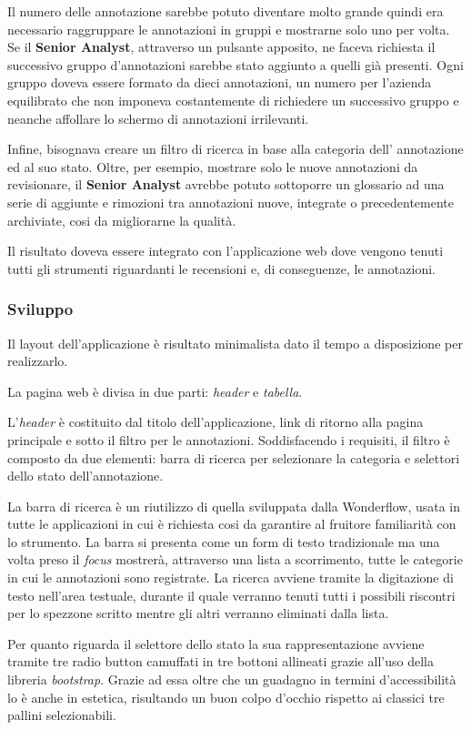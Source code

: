 Il numero delle annotazione sarebbe potuto diventare molto grande quindi era
necessario raggruppare le annotazioni in gruppi e mostrarne solo uno per volta.
Se il \textbf{Senior Analyst}, attraverso un pulsante apposito, ne faceva
richiesta il successivo gruppo d'annotazioni sarebbe stato aggiunto a quelli già
presenti. Ogni gruppo doveva essere formato da dieci annotazioni, un numero per
l'azienda equilibrato che non imponeva costantemente di richiedere un successivo
gruppo e neanche affollare lo schermo di annotazioni irrilevanti.

Infine, bisognava creare un filtro di ricerca in base alla categoria dell'
annotazione ed al suo stato. Oltre, per esempio, mostrare solo le nuove
annotazioni da revisionare, il \textbf{Senior Analyst} avrebbe potuto sottoporre
un glossario ad una serie di aggiunte e rimozioni tra annotazioni nuove,
integrate o precedentemente archiviate, cosi da migliorarne la qualità.

Il risultato doveva essere integrato con l'applicazione web dove vengono tenuti
tutti gli strumenti riguardanti le recensioni e, di conseguenze, le annotazioni.

\subsubsection{Sviluppo}
Il layout dell'applicazione è risultato minimalista dato il tempo a disposizione
per realizzarlo.

La pagina web è divisa in due parti: \textit{header} e \textit{tabella}.

L'\textit{header} è costituito dal titolo dell'applicazione, link di ritorno
alla pagina principale e sotto il filtro per le annotazioni. Soddisfacendo i
requisiti, il filtro è composto da due elementi: barra di ricerca per
selezionare la categoria e selettori dello stato dell'annotazione.

La barra di ricerca è un riutilizzo di quella sviluppata dalla Wonderflow, usata
in tutte le applicazioni in cui è richiesta cosi da garantire al fruitore
familiarità con lo strumento. La barra si presenta come un form di testo
tradizionale ma una volta preso il \textit{focus} mostrerà, attraverso una lista
a scorrimento, tutte le categorie in cui le annotazioni sono registrate. La
ricerca avviene tramite la digitazione di testo nell'area testuale, durante
il quale verranno tenuti tutti i possibili riscontri per lo spezzone scritto
mentre gli altri verranno eliminati dalla lista.

Per quanto riguarda il selettore dello stato la sua rappresentazione avviene
tramite tre radio button camuffati in tre bottoni allineati grazie all'uso
della libreria \textit{bootstrap}. Grazie ad essa oltre che un guadagno in
termini d'accessibilità lo è anche in estetica, risultando un buon colpo
d'occhio rispetto ai classici tre pallini selezionabili.

